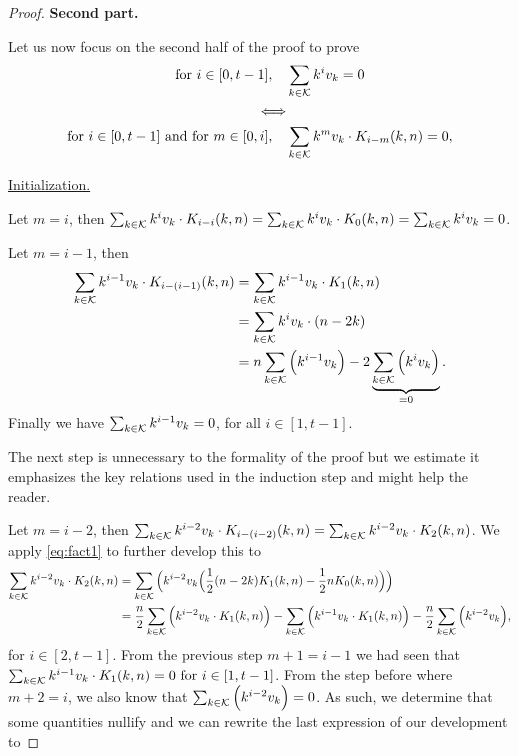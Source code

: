 \begin{proof}
    \textbf{Second part.}

    Let us now focus on the second half of the proof to prove
    \begin{equation*}
        \begin{split}
            \text{for } i \in [0, t-1], \quad &\sum_{k \in \mathcal{K}} k^iv_k = 0\\
            \Longleftrightarrow\\
            \text{for } i \in [0, t-1] \text{ and for } m \in [0, i], \quad &\sum_{k \in \mathcal{K}} k^mv_k \cdot K_{i-m}(k, n) = 0,
        \end{split}
    \end{equation*}

    \underline{Initialization.}

    Let $m = i$, then $\sum_{k \in \mathcal{K}} k^iv_k \cdot K_{i - i}(k, n) = \sum_{k \in \mathcal{K}} k^iv_k \cdot K_{0}(k, n) = \sum_{k \in \mathcal{K}} k^iv_k = 0$.

    Let $m = i - 1$, then
    \begin{equation*}
        \begin{split}
            \sum_{k \in \mathcal{K}} k^{i-1}v_k \cdot K_{i - (i-1)}(k, n) &= \sum_{k \in \mathcal{K}} k^{i-1}v_k \cdot K_{1}(k, n)\\ &= \sum_{k \in \mathcal{K}} k^iv_k \cdot (n - 2k)\\ &= n\sum_{k \in \mathcal{K}} \Big( k^{i-1}v_k \Big) - 2\underbrace{\sum_{k \in \mathcal{K}} \Big( k^iv_k \Big)}_{=0}.
        \end{split}
    \end{equation*}
    Finally we have $\sum_{k \in \mathcal{K}} k^{i-1}v_k = 0$, for all $i \in [1, t-1]$.

    The next step is unnecessary to the formality of the proof but we estimate it emphasizes the key relations used in the induction step and might help the reader.

    Let $m = i - 2$, then $\sum_{k \in \mathcal{K}} k^{i-2}v_k \cdot K_{i - (i-2)}(k, n) = \sum_{k \in \mathcal{K}} k^{i-2}v_k \cdot K_{2}(k, n)$. We apply \cref{eq:fact1} to further develop this to
    \begin{equation*}
        \begin{split}
            \sum_{k \in \mathcal{K}} k^{i-2}v_k \cdot K_{2}(k, n) &= \sum_{k \in \mathcal{K}} \Big( k^{i-2}v_k \Big( \frac{1}{2}(n - 2k)K_1(k, n) - \frac{1}{2}nK_0(k, n) \Big)\Big)\\
            &= \frac{n}{2}\sum_{k \in \mathcal{K}} \Big( k^{i-2}v_k \cdot K_1(k, n) \Big) - \sum_{k \in \mathcal{K}} \Big( k^{i-1}v_k \cdot K_1(k,n) \Big) - \frac{n}{2}\sum_{k \in \mathcal{K}} \Big( k^{i-2}v_k \Big),
        \end{split}
    \end{equation*}
    for $i \in [2, t-1]$.
    From the previous step $m + 1 = i - 1$ we had seen that $\sum_{k \in \mathcal{K}} k^{i-1}v_k \cdot K_1(k, n) = 0\text{ for } i \in [1, t-1]$. From the step before where $m + 2 = i$, we also know that $\sum_{k \in \mathcal{K}} \Big( k^{i-2}v_k \Big) = 0$. As such, we determine that some quantities nullify and we can rewrite the last expression of our development to


\end{proof}
